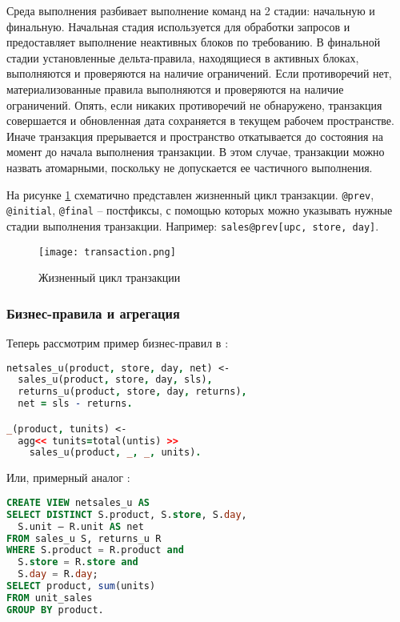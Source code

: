 Среда выполнения \logiql разбивает выполнение команд на 2 стадии: начальную и финальную. Начальная стадия используется для обработки запросов и предоставляет выполнение неактивных блоков по требованию. В финальной стадии установленные дельта-правила, находящиеся в активных блоках, выполняются и проверяются на наличие ограничений. Если противоречий нет, материализованные правила выполняются и проверяются на наличие ограничений. Опять, если никаких противоречий не обнаружено, транзакция совершается и обновленная дата сохраняется в текущем рабочем пространстве. Иначе транзакция прерывается и пространство откатывается до состояния на момент до начала выполнения транзакции. В этом случае, транзакции можно назвать атомарными, поскольку не допускается ее частичного выполнения.

На рисунке \ref{fig:technology:logiql:transaction} схематично представлен жизненный цикл транзакции. \lstinline{@prev}, \lstinline{@initial}, \lstinline{@final} – постфиксы, с помощью которых можно
указывать нужные стадии выполнения транзакции. Например:
\lstinline{sales@prev[upc, store, day]}.

\begin{landscape}
  \begin{figure}
  	\centering
  	\texttt{[image: transaction.png]}
  	\caption{Жизненный цикл транзакции}
  	\label{fig:technology:logiql:transaction}
  \end{figure}
\end{landscape}

\subsubsection{Бизнес-правила и агрегация}
\label{sec:technology:logiql:aggregations}

Теперь рассмотрим пример бизнес-правил в \logiql:

\begin{lstlisting}[language=Prolog]
netsales_u(product, store, day, net) <-
  sales_u(product, store, day, sls),
  returns_u(product, store, day, returns),
  net = sls - returns.

_(product, tunits) <-
  agg<< tunits=total(untis) >>
    sales_u(product, _, _, units).
\end{lstlisting}

Или, примерный аналог \sql:

\begin{lstlisting}[language=SQL]
CREATE VIEW netsales_u AS
SELECT DISTINCT S.product, S.store, S.day,
  S.unit – R.unit AS net
FROM sales_u S, returns_u R
WHERE S.product = R.product and
  S.store = R.store and
  S.day = R.day;
SELECT product, sum(units)
FROM unit_sales
GROUP BY product.
\end{lstlisting}


